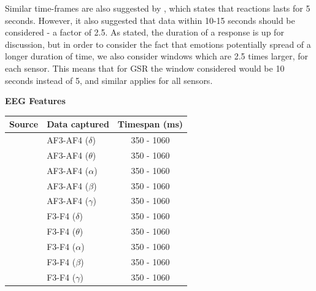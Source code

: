 Similar time-frames are also suggested by \cite{eeg_electrodes_0}, which states that reactions lasts for 5
seconds. However, it also suggested that data within 10-15 seconds should be considered - a factor of 2.5.  As stated,
the duration of a response is up for discussion, but in order to consider the fact that emotions potentially spread of a
longer duration of time, we also consider windows which are 2.5 times larger, for each sensor.  This means that for GSR
the window considered would be 10 seconds instead of 5, and similar applies for all sensors.

\begin{table}[H]
    \centering

    {\large \textbf{EEG Features}}\vspace{2pt}
    \begin{tabularx}{\columnwidth}{cXc}
        \toprule
        \textbf{Source} & \textbf{Data captured} & \textbf{Timespan (ms)} \\
        \midrule
        \small{\cite{eeg_music_listening,eeg_timespan_1,eeg_electrodes_1,eeg_electrodes_0}} & AF3-AF4 ($\delta$) & 350 - 1060 \\
        \small{\cite{eeg_music_listening,eeg_timespan_1,eeg_electrodes_1,eeg_electrodes_0}} & AF3-AF4 ($\theta$) & 350 - 1060 \\
        \small{\cite{eeg_music_listening,eeg_timespan_1,eeg_electrodes_1,eeg_electrodes_0}} & AF3-AF4 ($\alpha$) & 350 - 1060 \\
        \small{\cite{eeg_music_listening,eeg_timespan_1,eeg_electrodes_1,eeg_electrodes_0}} & AF3-AF4 ($\beta$)  & 350 - 1060 \\
        \small{\cite{eeg_music_listening,eeg_timespan_1,eeg_electrodes_1,eeg_electrodes_0}} & AF3-AF4 ($\gamma$) & 350 - 1060 \\
        \small{\cite{eeg_music_listening,eeg_timespan_1,eeg_electrodes_1,eeg_electrodes_0}} & F3-F4 ($\delta$) & 350 - 1060 \\
        \small{\cite{eeg_music_listening,eeg_timespan_1,eeg_electrodes_1,eeg_electrodes_0}} & F3-F4 ($\theta$) & 350 - 1060 \\
        \small{\cite{eeg_music_listening,eeg_timespan_1,eeg_electrodes_1,eeg_electrodes_0}} & F3-F4 ($\alpha$) & 350 - 1060 \\
        \small{\cite{eeg_music_listening,eeg_timespan_1,eeg_electrodes_1,eeg_electrodes_0}} & F3-F4 ($\beta$)  & 350 - 1060 \\
        \small{\cite{eeg_music_listening,eeg_timespan_1,eeg_electrodes_1,eeg_electrodes_0}} & F3-F4 ($\gamma$) & 350 - 1060 \\
        \bottomrule
    \end{tabularx}
    \label{[TABLE] features eeg}


\end{table}
